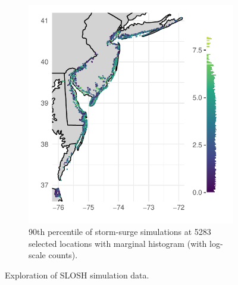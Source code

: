 \begin{figure}[t!]
\begin{subfigure}[t]{0.48\textwidth}
        \includegraphics[width=0.99\linewidth]{./plots/sloshthreshold_loghist}
        \caption{
            90th percentile of storm-surge simulations at \num{5283} selected 
            locations with marginal histogram (with log-scale counts).
            \label{fig:sloshthreshold}}
    \end{subfigure}
    \caption{Exploration of SLOSH simulation data.\label{fig:sloshexplore}}
\end{figure}

